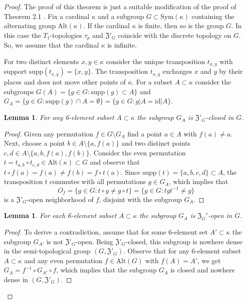 \documentclass[11pt, twoside]{amsart}
\newtheorem{lemma}[theorem]{Lemma}
\theoremstyle{definition}
\begin{document}
\begin{proof} The proof of this theorem is just a suitable modification of the proof of Theorem 2.1 \cite{BGP}. Fix a cardinal $\kappa$ and a subgroup $G\subset{\mathrm{Sym}}(\kappa)$ containing the alternating group ${\mathrm{Alt}}(\kappa)$. If the cardinal $\kappa$ is finite, then so is the group $G$. In this case the $T_1$-topologies $\tau_p$ and ${\mathfrak Z}'_G$ coincide with the discrete topology on $G$. So, we assume that the cardinal $\kappa$ is infinite.

For two distinct elements $x,y\in \kappa$ consider the unique transposition $t_{x,y}$ with support ${\mathrm{supp}}(t_{x,y})=\{x,y\}$. The transposition $t_{x,y}$ exchanges $x$ and $y$ by their places and does not move other points of $\kappa$. For a subset $A\subset\kappa$ consider the subgroups $G(A)=\{g\in G:{\mathrm{supp}}(g)\subset A\}$ and $G_A=\{g\in G:{\mathrm{supp}}(g)\cap A=\emptyset\}=\{g\in G:g|A={\mathrm{id}}|A\}$.

\begin{lemma} For any 6-element subset $A\subset \kappa$ the subgroup $G_A$ is ${\mathfrak Z}'_G$-closed in $G$.
\end{lemma}

\begin{proof} Given any permutation $f\in G\setminus G_A$ find a point $a\in A$ with $f(a)\ne a$. Next, choose a point $b\in A\setminus \{a,f(a)\}$ and two distinct points $c,d\in A\setminus\{a,b,f(a),f(b)\}$. Consider the even permutation $t=t_{a,b}\circ t_{c,d}\in{\mathrm{Alt}}(\kappa)\subset G$ and observe that $t\circ f(a)=f(a)\ne f(b)=f\circ t(a)$. Since ${\mathrm{supp}}(t)=\{a,b,c,d\}\subset A$, the transposition $t$ commutes with all permutations $g\in G_A$, which implies that $$O_f=\{g\in G:t\circ g\ne g\circ t\}=\{g\in G:tgt^{-1}\ne g\}$$is a ${\mathfrak Z}'_G$-open neighborhood of $f$, disjoint with the subgroup $G_A$.
\end{proof}

\begin{lemma}\label{l:open} For each 6-element subset $A\subset \kappa$ the subgroup $G_A$ is ${\mathfrak Z}_G'$-open in $G$.
\end{lemma}

\begin{proof} To derive a contradiction, assume that for some 6-element set $A'\subset \kappa$ the subgroup $G_{A'}$ is not ${\mathfrak Z}'_G$-open. Being ${\mathfrak Z}'_G$-closed, this subgroup is nowhere dense in the semi-topological group $(G,{\mathfrak Z}'_G)$. Observe that for any 6-element subset $A\subset \kappa$ and any even permutation $f\in {\mathrm{Alt}}(G)$ with $f(A)=A'$, we get $G_{A}=f^{-1}\circ G_{A'}\circ f$, which implies that the subgroup $G_A$ is closed and nowhere dense in $(G,{\mathfrak Z}'_G)$.


\end{proof}
\end{proof}
\end{document}

